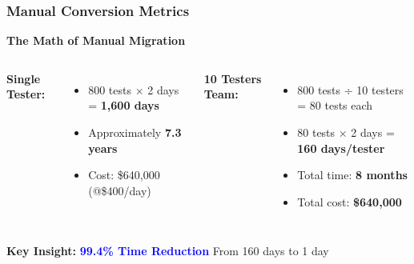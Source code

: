 \begin{frame}
\frametitle{Manual Conversion Metrics}
\begin{center}
\textbf{The Math of Manual Migration}
\end{center}

\begin{columns}
\textbf{Single Tester:}
\begin{itemize}
    \item 800 tests × 2 days = \textbf{1,600 days}
    \item Approximately \textbf{7.3 years}
    \item Cost: \$640,000 (@\$400/day)
\end{itemize}

\textbf{10 Testers Team:}
\begin{itemize}
    \item 800 tests ÷ 10 testers = 80 tests each
    \item 80 tests × 2 days = \textbf{160 days/tester}
    \item Total time: \textbf{8 months}
    \item Total cost: \textbf{\$640,000}
\end{itemize}
\end{columns}

\begin{center}
\textbf{Key Insight:} {\normalsize\textcolor{blue}{\textbf{99.4\% Time Reduction}}}
{From 160 days to 1 day}
\end{center}
\end{frame}

